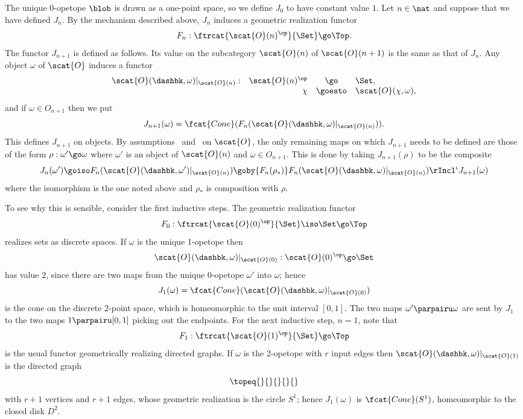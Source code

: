 The unique 0-opetope $\blob$ is drawn as a one-point space, so we define
$J_0$ to have constant value $1$.  Let $n\in\nat$ and suppose that we have
defined $J_n$.  By the mechanism described above, $J_n$ induces a geometric
realization functor
\[
F_n: \ftrcat{\scat{O}(n)^\op}{\Set} \go \Top.
\]
The functor $J_{n+1}$ is defined as follows.  Its value on the subcategory
$\scat{O}(n)$ of $\scat{O}(n+1)$ is the same as that of $J_n$.  Any object
$\omega$ of $\scat{O}$ induces a functor
\[
\begin{array}{rrcl}
\scat{O}(\dashbk, \omega)|_{\scat{O}(n)}:&
\scat{O}(n)^\op				&
\go					&
\Set,					\\
					&
\chi					&
\goesto					&
\scat{O}(\chi,\omega),			\\
\end{array}
\]
and if $\omega\in O_{n+1}$ then we put
\[
J_{n+1}(\omega) 
= 
\fcat{Cone}(F_n(\scat{O}(\dashbk, \omega)|_{\scat{O}(n)})).
\]
This defines $J_{n+1}$ on objects.  By assumptions~
and~ on $\scat{O}$, the only remaining maps on which
$J_{n+1}$ needs to be defined are those of the form $\rho: \omega' \go
\omega$ where $\omega'$ is an object of $\scat{O}(n)$ and $\omega\in
O_{n+1}$.  This is done by taking $J_{n+1}(\rho)$ to be the composite
\[
J_n(\omega') \goiso F_n(\scat{O}(\dashbk, \omega')|_{\scat{O}(n)})
\goby{F_n(\rho_*)} F_n(\scat{O}(\dashbk, \omega)|_{\scat{O}(n)})
\rIncl^{\iota} J_{n+1}(\omega)
\]
where the isomorphism is the one noted above and $\rho_*$ is composition
with $\rho$. 

To see why this is sensible, consider the first inductive steps.  The
geometric realization functor
\[
F_0: \ftrcat{\scat{O}(0)^\op}{\Set} \iso \Set \go \Top
\]
realizes sets as discrete spaces.  If $\omega$ is the unique 1-opetope then
\[
\scat{O}(\dashbk,\omega)|_{\scat{O}(0)}:
\scat{O}(0)^\op
\go
\Set
\]
has value $2$, since there are two maps from the unique 0-opetope $\omega'$
into $\omega$; hence
\[
J_1(\omega) = \fcat{Cone}(\scat{O}(\dashbk,\omega)|_{\scat{O}(0)})
\]
is the cone on the discrete 2-point space, which is homeomorphic to the
unit interval $[0,1]$.  The two maps $\omega' \parpairu \omega$ are sent by
$J_1$ to the two maps $1 \parpairu [0,1]$ picking out the endpoints.  For
the next inductive step, $n=1$, note that 
\[
F_1: \ftrcat{\scat{O}(1)^\op}{\Set} \go \Top
\]
is the usual functor geometrically%
%
%
realizing directed graphs.  If $\omega$
is the 2-opetope with $r$ input edges then
$\scat{O}(\dashbk,\omega)|_{\scat{O}(1)}$ is the directed graph
\[
\topeq{}{}{}{}{}
\]
with $r+1$ vertices and $r+1$ edges, whose geometric realization is the
circle $S^1$; hence $J_1(\omega)$ is $\fcat{Cone}(S^1)$, homeomorphic to
the closed disk $D^2$.%
%
%
%
%
%
%
%
%
%



